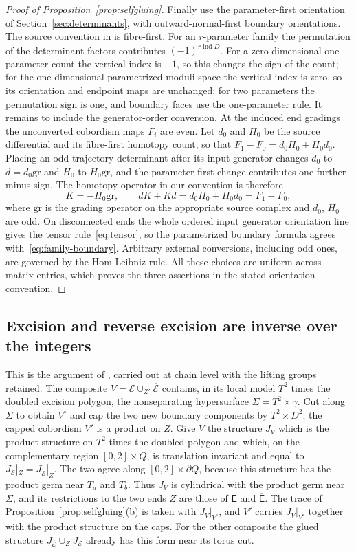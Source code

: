 \documentclass[11pt]{amsart}
\theoremstyle{definition}
\theoremstyle{remark}
\theoremstyle{plain}
\numberwithin{equation}{section}
\newcommand{\eps}{\mathrm{gr}}
\newcommand{\ind}{\operatorname{ind}}
\begin{document}
\begin{proof}[Proof of Proposition~\ref{prop:selfgluing}]
Finally use the parameter-first orientation of Section~\ref{sec:determinants},
with outward-normal-first boundary orientations. The source convention
in \cite[Section~3.9]{KM-unknot} is fibre-first. For an $r$-parameter family
the permutation of the determinant factors contributes $(-1)^{r\ind D}$. For a
zero-dimensional one-parameter count the vertical index is $-1$, so this
changes the sign of the count; for the one-dimensional parametrized moduli
space the vertical index is zero, so its orientation and endpoint maps are
unchanged; for two parameters the permutation sign is one, and boundary faces
use the one-parameter rule. It remains to include the generator-order
conversion. At the induced end gradings the unconverted cobordism maps $F_i$
are even. Let $d_0$ and $H_0$ be the source differential and its fibre-first
homotopy count, so that $F_1-F_0=d_0H_0+H_0d_0$. Placing an odd trajectory
determinant after its input generator changes $d_0$ to $d=d_0\eps$ and $H_0$
to $H_0\eps$, and the parameter-first change contributes one further minus
sign. The homotopy operator in our convention is therefore
\[
 K=-H_0\eps,\qquad
 dK+Kd=d_0H_0+H_0d_0=F_1-F_0,
\]
where $\eps$ is the grading operator on the appropriate source complex and
$d_0$, $H_0$ are odd. On disconnected ends the whole ordered input generator
orientation line gives the tensor rule~\eqref{eq:tensor}, so the parametrized
boundary formula agrees with~\eqref{eq:family-boundary}. Arbitrary external
conversions, including odd ones, are governed by the Hom Leibniz rule. All
these choices are uniform across matrix entries, which proves the three
assertions in the stated orientation convention.
\end{proof}

\subsection{Excision and reverse excision are inverse over the integers}
\label{subsec:capped}
This is the argument of \cite[Theorem~5.6]{KM-unknot}, carried out at chain
level with the lifting groups retained. The composite
$V=\mathcal E\cup_{Z'}\overline{\mathcal E}$ contains, in its local model $T^2$
times the doubled excision polygon, the nonseparating hypersurface
$\Sigma=T^2\times\gamma$. Cut along $\Sigma$ to obtain $V^\circ$ and cap the
two new boundary components by $T^2\times D^2$; the capped cobordism $V'$ is a
product on $Z$. Give $V$ the structure $J_V$ which is the product structure on
$T^2$ times the doubled polygon and which, on the complementary region
$[0,2]\times Q$, is translation invariant and equal to
$J_{\mathcal E}|_Z=J_{\overline{\mathcal E}}|_Z$. The two agree along
$[0,2]\times\partial Q$, because this structure has the product germ near
$T_a$ and $T_b$. Thus $J_V$ is cylindrical with the product germ near
$\Sigma$, and its restrictions to the two ends $Z$ are those of $\mathsf E$
and $\overline{\mathsf E}$. The trace of Proposition~\ref{prop:selfgluing}(b) is
taken with $J_V|_{V^\circ}$, and $V'$ carries $J_V|_{V^\circ}$ together with
the product structure on the caps. For the other composite the glued
structure $J_{\overline{\mathcal E}}\cup_ZJ_{\mathcal E}$ already has this form
near its torus cut.
\end{document}
